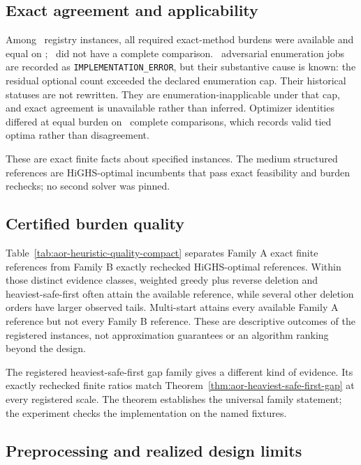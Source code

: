 \subsection{Exact agreement and applicability}

Among \AORExactCapable\ registry instances, all required exact-method burdens
were available and equal on \AORExactAgreement; \AORExactUnavailable\ did not
have a complete comparison. \AORImplementationErrors\ adversarial enumeration
jobs are recorded as
\texttt{IMPLEMENTATION\_ERROR}, but their substantive cause is known: the
residual optional count exceeded the declared enumeration cap. Their historical
statuses are not rewritten. They are enumeration-inapplicable under that cap,
and exact agreement is unavailable rather than inferred. Optimizer identities
differed at equal burden on \AOROptimizerIdentityDifferences\ complete
comparisons, which records valid tied optima rather than disagreement.

These are exact finite facts about specified instances. The medium structured
references are HiGHS-optimal incumbents that pass exact feasibility and burden
rechecks; no second solver was pinned.

\subsection{Certified burden quality}

Table~\ref{tab:aor-heuristic-quality-compact} separates Family A exact finite
references from Family B exactly rechecked HiGHS-optimal references. Within
those distinct evidence classes, weighted greedy plus reverse deletion and
heaviest-safe-first often attain the available reference, while several other
deletion orders have larger observed tails. Multi-start attains every available
Family A reference but not every Family B reference. These are descriptive
outcomes of the registered instances, not approximation guarantees or an
algorithm ranking beyond the design.

\AORHeuristicQualityTable

The registered heaviest-safe-first gap family gives a different kind of
evidence. Its exactly rechecked finite ratios match
Theorem~\ref{thm:aor-heaviest-safe-first-gap} at every registered scale. The
theorem establishes the universal family statement; the experiment checks the
implementation on the named fixtures.

\AORAdversarialGapTable

\subsection{Preprocessing and realized design limits}

